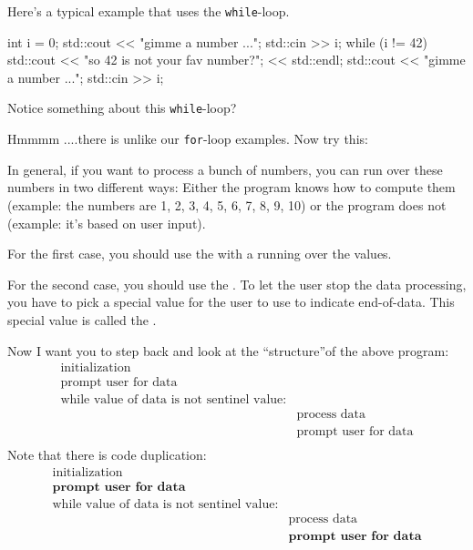 \newpage{}

Here's a typical example that uses the \texttt{while}-loop.
\begin{console}
int i = 0;
std::cout << "gimme a number ...";
std::cin >> i;
while (i != 42)
{     
      std::cout << "so 42 is not your fav number?";
                << std::endl;
      std::cout << "gimme a number ...";
      std::cin >> i;
}
\end{console}

Notice something about this \texttt{while}-loop?

Hmmmm ....there is  unlike our \texttt{for}-loop examples. Now try this:

In general, if you want to process a bunch of numbers, you can run over
these numbers in two different ways: Either the program knows how to
compute them (example: the numbers are 1, 2, 3, 4, 5, 6, 7, 8, 9, 10) or
the program does not (example: it's based on user
input).

For the first case, you should use the  with a
 running over the values.

For the second case, you should use the . To let the
user stop the data processing, you have to pick a special value for the
user to use to indicate end-of-data. This special value is called the
.

Now I want you to step back and look at the ``structure''of the above
program:
\begin{align*}
\text{initialization}\\
\text{prompt user for data}\\
\text{while value of data is not sentinel value:}\\
&\text{process data}\\
&\text{prompt user for data}\\
\end{align*}
Note that there is code duplication:
\begin{align*}
\text{initialization}\\
\textbf{prompt user for data}\\
\text{while value of data is not sentinel value:}\\
&\text{process data}\\
&\textbf{prompt user for data}\\
\end{align*}

